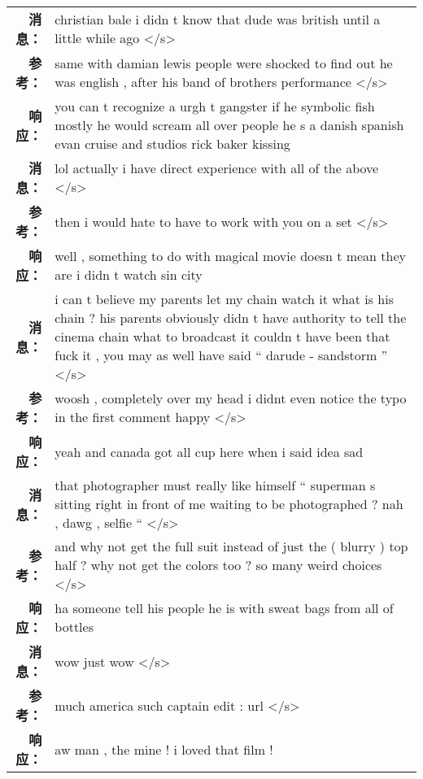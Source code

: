 \begin{tabularx}{0.8\textwidth}{@{}rX@{}}%
\toprule%
\midrule%
\textbf{消息：}&christian bale i didn t know that dude was british until a little while ago </s>\\%
\textbf{参考：}&same with damian lewis people were shocked to find out he was english , after his band of brothers performance </s>\\%
\textbf{响应：}&you can t recognize a urgh t gangster if he symbolic fish mostly he would scream all over people he s a danish spanish evan cruise and studios rick baker kissing\\%
\midrule%
\textbf{消息：}&lol actually i have direct experience with all of the above </s>\\%
\textbf{参考：}&then i would hate to have to work with you on a set </s>\\%
\textbf{响应：}&well , something to do with magical movie doesn t mean they are i didn t watch sin city\\%
\midrule%
\textbf{消息：}&i can t believe my parents let my chain watch it what is his chain ? his parents obviously didn t have authority to tell the cinema chain what to broadcast it couldn t have been that fuck it , you may as well have said `` darude {-} sandstorm '' </s>\\%
\textbf{参考：}&woosh , completely over my head i didnt even notice the typo in the first comment happy </s>\\%
\textbf{响应：}&yeah and canada got all cup here when i said idea sad\\%
\midrule%
\textbf{消息：}&that photographer must really like himself `` superman s sitting right in front of me waiting to be photographed ? nah , dawg , selfie `` </s>\\%
\textbf{参考：}&and why not get the full suit instead of just the ( blurry ) top half ? why not get the colors too ? so many weird choices </s>\\%
\textbf{响应：}&ha someone tell his people he is with sweat bags from all of bottles\\%
\midrule%
\textbf{消息：}&wow just wow </s>\\%
\textbf{参考：}&much america such captain edit : url </s>\\%
\textbf{响应：}&aw man , the mine ! i loved that film !\\%
\midrule\bottomrule%
%
\end{tabularx}